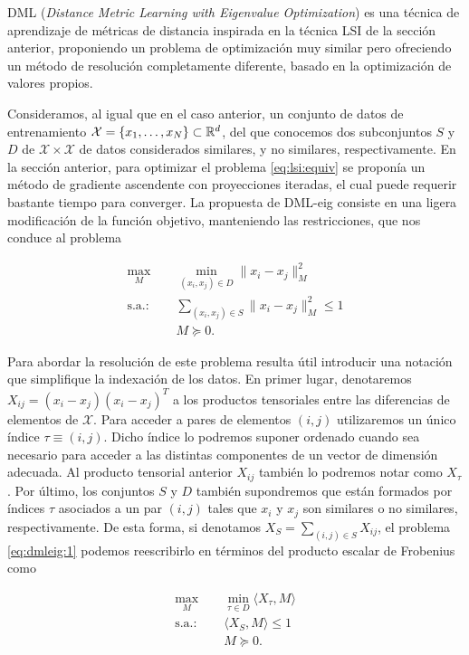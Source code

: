 DML (\emph{Distance Metric Learning with Eigenvalue Optimization}) \cite{dmleig} es una técnica de aprendizaje de métricas de distancia inspirada en la técnica LSI de la sección anterior, proponiendo un problema de optimización muy similar pero ofreciendo un método de resolución completamente diferente, basado en la optimización de valores propios.

Consideramos, al igual que en el caso anterior, un conjunto de datos de entrenamiento $\mathcal{X} = \{x_1,\dots,x_N\} \subset \mathbb{R}^d$, del que conocemos dos subconjuntos $S$ y $D$ de $\mathcal{X}\times\mathcal{X}$ de datos considerados similares, y no similares, respectivamente. En la sección anterior, para optimizar el problema \ref{eq:lsi:equiv} se proponía un método de gradiente ascendente con proyecciones iteradas, el cual puede requerir bastante tiempo para converger. La propuesta de DML-eig consiste en una ligera modificación de la función objetivo, manteniendo las restricciones, que nos conduce al problema

\begin{equation} \label{eq:dmleig:1}
\begin{split}
    \max_{M} &\quad \min_{(x_i,x_j)\in D}  \|x_i - x_j \|_M^2 \\
    \text{s.a.: } &\quad \sum_{(x_i,x_j) \in S} \|x_i - x_j\|_M^2 \le 1 \\
                  &\quad M \succeq 0.
\end{split}
\end{equation}

Para abordar la resolución de este problema resulta útil introducir una notación que simplifique la indexación de los datos. En primer lugar, denotaremos $X_{ij} = (x_i-x_j)(x_i-x_j)^T$ a los productos tensoriales entre las diferencias de elementos de $\mathcal{X}$. Para acceder a pares de elementos $(i,j)$ utilizaremos un único índice $\tau \equiv (i,j)$. Dicho índice lo podremos suponer ordenado cuando sea necesario para acceder a las distintas componentes de un vector de dimensión adecuada. Al producto tensorial anterior $X_{ij}$ también lo podremos notar como $X_{\tau}$. Por último, los conjuntos $S$ y $D$ también supondremos que están formados por índices $\tau$ asociados a un par $(i,j)$ tales que $x_i$ y $x_j$ son similares o no similares, respectivamente. De esta forma, si denotamos $X_S = \sum_{(i,j)\in S}X_{ij}$, el problema \ref{eq:dmleig:1} podemos reescribirlo en términos del producto escalar de Frobenius como

\begin{equation} \label{eq:dmleig:2}
\begin{split}
    \max_{M} &\quad \min_{\tau \in D}  \langle X_{\tau}, M \rangle \\
    \text{s.a.: } &\quad \langle X_S, M \rangle \le 1 \\
                  &\quad M \succeq 0.
\end{split}
\end{equation}

